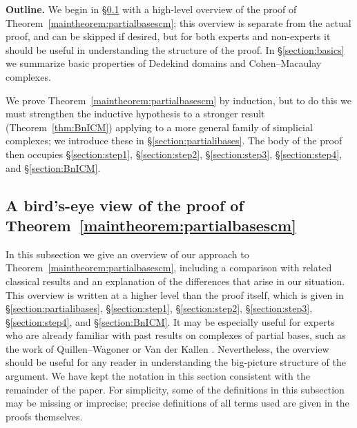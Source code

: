 \documentclass[11 pt]{article}
\theoremstyle{plain}
\theoremstyle{definition}
\numberwithin{equation}{section}
\newcommand{\para}[1]{\bigskip\noindent\textbf{#1.}}
\begin{document}
\para{Outline}
We begin in \S\ref{section:expertoverview} with a high-level  overview of the proof of Theorem~\ref{maintheorem:partialbasescm}; this overview is separate from the actual proof, and can be skipped if desired, but for both experts and non-experts it should be useful in understanding the structure of the proof. 
In \S\ref{section:basics} we summarize basic properties of Dedekind domains and Cohen--Macaulay complexes.

We prove Theorem~\ref{maintheorem:partialbasescm} by induction, but to do this we must strengthen the inductive hypothesis to a stronger result (Theorem~\ref{thm:BnICM}) applying to a more general family of simplicial complexes; we introduce these in \S\ref{section:partialibases}.
The body of the proof then occupies \S\ref{section:step1}, \S\ref{section:step2}, \S\ref{section:step3}, \S\ref{section:step4}, and \S\ref{section:BnICM}.

\subsection{A bird's-eye view of the proof of Theorem~\ref{maintheorem:partialbasescm}}
\label{section:expertoverview}
In this subsection we give an overview of our approach to Theorem~\ref{maintheorem:partialbasescm}, including a comparison with related classical results and an explanation of the differences that arise in our situation. This overview is written at a higher level than the proof itself, which is given in \S\ref{section:partialibases}, \S\ref{section:step1}, \S\ref{section:step2}, \S\ref{section:step3}, \S\ref{section:step4}, and \S\ref{section:BnICM}.  It may be especially useful for experts who are already familiar with past results on complexes of partial bases, such as the work of Quillen--Wagoner \cite{Wagoner} or Van der Kallen \cite{VanDerKallenStability}. Nevertheless, the overview should be useful for any reader in understanding the big-picture structure of the argument.  We have kept the notation in this section consistent with the remainder of the paper.  For simplicity, some of the definitions in this subsection may be missing or imprecise; precise definitions of all terms used are given 
in the proofs themselves. 
\end{document}
